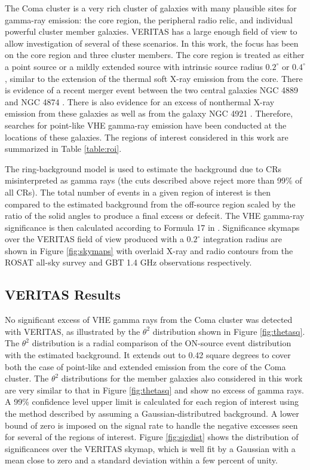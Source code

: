 \documentclass[12pt,manuscript]{aastex}
\begin{document}
The Coma cluster is a very rich cluster of galaxies with many plausible sites for gamma-ray
emission: the core region, the peripheral radio relic, and individual powerful cluster
member galaxies. VERITAS has a large enough field of view to allow investigation of several of
these scenarios. In this work, the focus has been on the core region and three cluster members. The
core region is treated as either a point
source or a mildly extended source with intrinsic source radius $0.2^{\circ}$ or $0.4^{\circ}$,
similar to the extension of the thermal soft X-ray emission from the core. There
is evidence of a recent merger event between the two central galaxies NGC 4889 and NGC 4874
\citep{article:Tribble:1993}. There is also evidence for an excess of nonthermal X-ray emission
from these galaxies as well as from the galaxy NGC 4921 \citep{article:Neumann_etal:2003}.
Therefore, searches for point-like VHE gamma-ray emission have been conducted at the locations of
these galaxies. The regions of interest considered in this work are summarized in Table
\ref{table:roi}.

The ring-background model \citep{article:Aharonian_etal:2001} is used to estimate the background
due to CRs misinterpreted as gamma rays (the cuts described above reject more than 99\% of all
CRs). The total number of events in a given region of interest is then compared to the estimated
background from the off-source region scaled by the ratio of the solid angles to produce a final
excess or defecit. The VHE gamma-ray significance is then calculated according to Formula 17 in
\citet{article:LiMa:1983}. Significance skymaps over the VERITAS field of view produced with a
$0.2^{\circ}$ integration radius are shown in Figure \ref{fig:skymaps} with overlaid X-ray and radio
contours from the ROSAT all-sky survey \citep{article:BrielHenryBohringer:1992}  and GBT 1.4 GHz
observations \citep{article:BrownRudnick:2010} respectively.

%
%

\subsection{VERITAS Results}
No significant excess of VHE gamma rays from the Coma cluster was detected with VERITAS, as
illustrated by the $\theta^{2}$ distribution shown in Figure \ref{fig:thetasq}. The $\theta^{2}$
distribution is a radial comparison of the ON-source event distribution with the estimated
background. It extends out to 0.42 square degrees to cover both the case of point-like and extended
emission from the core of the Coma cluster. The $\theta^{2}$ distributions for the member galaxies
also considered in this work are very similar to that in Figure \ref{fig:thetasq} and show no
excess of gamma rays. A 99\% confidence level upper limit is calculated for each region of
interest using the method described by \citet{article:Rolke_etal:2005} assuming a
Gaussian-distributred background. A lower bound of zero is imposed on the signal rate to handle the
negative excesses seen for several of the regions of interest. Figure \ref{fig:sigdist} shows the
distribution of significances over the VERITAS skymap, which is well fit by a Gaussian with a mean
close to zero and a standard deviation within a few percent of unity.
\end{document}
